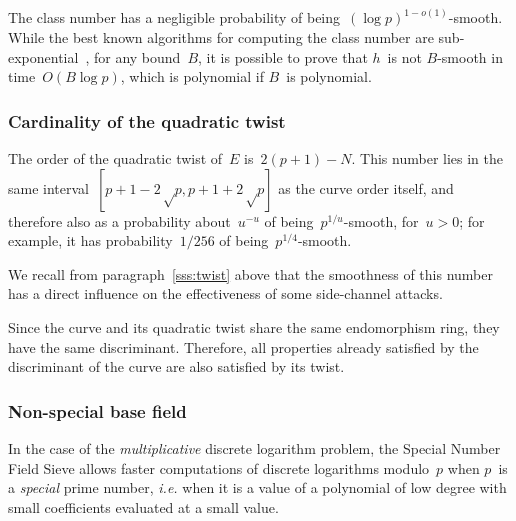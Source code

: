 \documentclass[twocolumn,letterpaper,10pt]{article}
\DeclareMathOperator\Cl{Cl}
\begin{document}
\medbreak

The class number has a negligible probability
of being~$(\log p)^{1-o(1)}$-smooth.
While the best known algorithms for computing the class number
are sub-exponential~\cite{ams1989hmc,chile2009biasse},
for any bound~$B$,
it is possible to prove that $h$~is not $B$-smooth
in time~$O(B \log p)$,
which is polynomial if $B$~is polynomial.


\subsubsection{Cardinality of the quadratic twist}
\label{sss:normal-twist}

The order of the quadratic twist of~$E$ is~$2(p+1) - N$.
This number lies in the same interval~$[p+1-2√p, p+1+2√p]$
as the curve order itself,
and therefore also as a probability about~$u^{-u}$
of being~$p^{1/u}$-smooth, for~$u > 0$;
for example, it has probability~$1/256$ of being~$p^{1/4}$-smooth.

We recall from paragraph~\ref{sss:twist} above
that the smoothness of this number has a direct influence
on the effectiveness of some side-channel attacks.

Since the curve and its quadratic twist
share the same endomorphism ring,
they have the same discriminant.
Therefore, all properties already satisfied
by the discriminant of the curve are also satisfied by its twist.

\subsubsection{Non-special base field}
\label{sss:special-anormal}

In the case of the \emph{multiplicative} discrete logarithm problem,
the Special Number Field Sieve allows faster computations
of discrete logarithms modulo~$p$
when $p$~is a \emph{special} prime number,
\emph{i.e.} when it is a value of a polynomial of low degree
with small coefficients evaluated at a small value.
\end{document}
